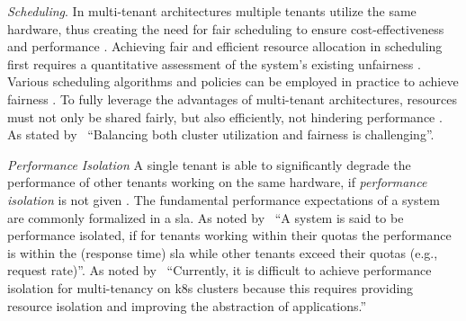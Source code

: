 \documentclass[11pt, a4paper, oneside, listof=totoc]{scrartcl}
\begin{document}
\begin{enumerate}[label={[\arabic*]:},
                    ref=Challenge~\arabic*,
                    leftmargin=*,
                    itemsep=0.6\baselineskip]
                    \item\label{chal:scheduling}
                        \textit{Scheduling}.
                        In multi-tenant architectures multiple tenants utilize the same hardware,
                        thus creating the need for fair scheduling to ensure cost-effectiveness
                        and performance \parencite[p.~32597]{simi2024}.
                        Achieving fair and efficient resource allocation in scheduling first
                        requires a quantitative assessment of the system's existing unfairness
                        \parencites[p.~7]{ebrahimi2012}[p.~14]{beltre2019}[pp.~2--3]{ghodsi2011}.
                        Various scheduling algorithms and policies can be employed in practice to
                        achieve fairness \parencites[pp.~14--16]{beltre2019}[p.~4]{ghodsi2011}.
                        To fully leverage the advantages of multi-tenant architectures, resources
                        must not only be shared fairly, but also efficiently, not hindering
                        performance \parencite[p.~14]{beltre2019}.
                        As stated by~\cite[p.~14]{beltre2019} \enquote{Balancing both cluster
                        utilization and fairness is challenging}.
                    
                    \item\label{chal:isolation}
                        \textit{Performance Isolation}
                        A single tenant is able to significantly degrade the performance of other
                        tenants working on the same hardware, if \textit{performance isolation}
                        is not given \parencite[p.~195]{krebs2013}.
                        The fundamental performance expectations of a system are commonly formalized
                        in a \gls{sla}.
                        As noted by~\cite[p.~195]{krebs2013} \enquote{A system is said to be
                        performance isolated, if for tenants working within their quotas the
                        performance is within the (response time) \gls{sla} while other
                        tenants exceed their quotas (e.g., request rate)}.
                        As noted by~\cite[p.~18]{carrion2022} \enquote{Currently, it is difficult
                        to achieve performance isolation for multi-tenancy on \gls{k8s} clusters
                        because this requires providing resource isolation and improving the
                        abstraction of applications.}


\end{enumerate}
\end{document}
